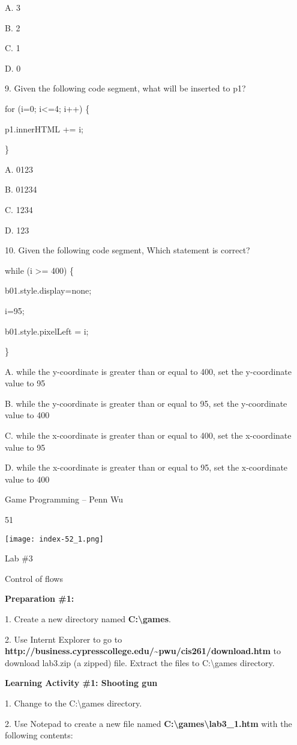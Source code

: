 \documentclass[
]{article}
\begin{document}
A. 3

B. 2

C. 1

D. 0

9. Given the following code segment, what will be inserted to p1?

for (i=0; i\textless=4; i++) \{

p1.innerHTML += i;

\}

A. 0123

B. 01234

C. 1234

D. 123

10. Given the following code segment, Which statement is correct?

while (i \textgreater= 400) \{

b01.style.display=\textquotesingle none\textquotesingle;

i=95;

b01.style.pixelLeft = i;

\}

A. while the y-coordinate is greater than or equal to 400, set the
y-coordinate value to 95

B. while the y-coordinate is greater than or equal to 95, set the
y-coordinate value to 400

C. while the x-coordinate is greater than or equal to 400, set the
x-coordinate value to 95

D. while the x-coordinate is greater than or equal to 95, set the
x-coordinate value to 400

Game Programming -- Penn Wu

51

\protect\hypertarget{index_split_004.htmlux5cux23p52}{}{}\texttt{[image: index-52\_1.png]}

Lab \#3

Control of flows

\textbf{Preparation \#1:}

1. Create a new directory named \textbf{C:\textbackslash games}.

2. Use Internt Explorer to go to
\textbf{http://business.cypresscollege.edu/\textasciitilde pwu/cis261/download.htm}
to download lab3.zip (a zipped) file. Extract the files to
C:\textbackslash games directory.

\textbf{Learning Activity \#1: Shooting gun}

1. Change to the C:\textbackslash games directory.

2. Use Notepad to create a new file named
\textbf{C:\textbackslash games\textbackslash lab3\_1.htm} with the
following contents:
\end{document}

